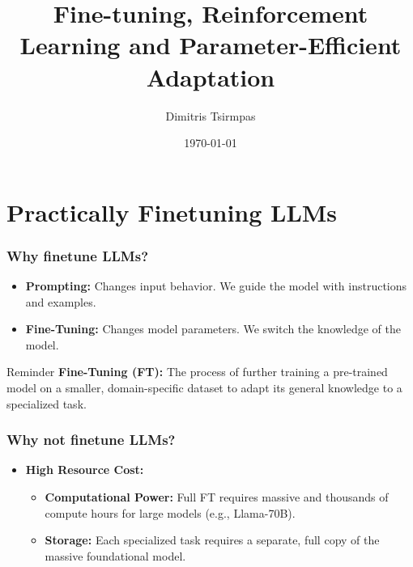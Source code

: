 \documentclass[24pt]{beamer}
\title[LLM Optimization]{Fine-tuning, Reinforcement Learning and Parameter-Efficient Adaptation}
\author{Dimitris Tsirmpas}
\date{\today}
\institute{Athens University of Economics and Business \and Archimedes, Athena Research Center}
\begin{document}
    \begin{frame}
        \titlepage
    \end{frame}
    
    
    \section{Practically Finetuning LLMs}

    \begin{frame}
        \frametitle{Why finetune LLMs?}
        \begin{itemize}
            \item \textbf{Prompting:} Changes \alert{input behavior}. We
            guide the model with instructions and examples.
            \item \textbf{Fine-Tuning:} Changes \alert{model parameters}. We
            switch the \alert{knowledge} of the model.
        \end{itemize}

       \begin{block}{Reminder}
       	\textbf{Fine-Tuning (FT):} The process of further training a pre-trained model on a smaller, domain-specific dataset to adapt its general knowledge to a specialized task.
       \end{block}
    \end{frame}

    
    \begin{frame}
    	\frametitle{Why not finetune LLMs?}
    	\begin{itemize}
    		\item \textbf{High Resource Cost:}
    		\begin{itemize}
    			\item \textbf{Computational Power:} Full FT requires massive and thousands of compute hours for large models (e.g.,
    			Llama-70B). 
    			
    			\item \textbf{Storage:} Each specialized task
    			requires a separate, full copy of the massive foundational
    			model.
    		\end{itemize}
    	\end{itemize}
    \end{frame}
    
\end{document}
